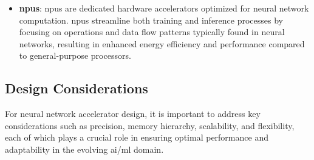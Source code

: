 \begin{itemize}
\begin{enumerate}
		\item \textbf{Prototyping and Evolution}: Given their reconfigurable nature, \glspl{fpga} are excellent platforms for prototyping neural network architectures. Furthermore, in environments where neural network models evolve or get updated frequently, \glspl{fpga} can adapt without requiring new hardware.
		
		\item \textbf{Trade-offs}: While \glspl{fpga} offer flexibility, they might not achieve the same level of performance or energy efficiency as a highly-optimized \gls{asic} for a specific task. However, their adaptability can outweigh this in certain scenarios.
	\end{enumerate}
	
	In the context of the rapidly evolving field of \gls{ai}/\gls{ml}, \glspl{fpga} provide a compelling balance of adaptability and performance, especially when agility in hardware is desired.
	
	\item \textbf{\glspl{npu}}: \glspl{npu} are dedicated hardware accelerators optimized for neural network computation. \glspl{npu} streamline both training and inference processes by focusing on operations and data flow patterns typically found in neural networks, resulting in enhanced energy efficiency and performance compared to general-purpose processors.
	
\end{itemize}

\subsection{Design Considerations}
For neural network accelerator design, it is important to address key considerations such as precision, memory hierarchy, scalability, and flexibility, each of which plays a crucial role in ensuring optimal performance and adaptability in the evolving \gls{ai}/\gls{ml} domain.

